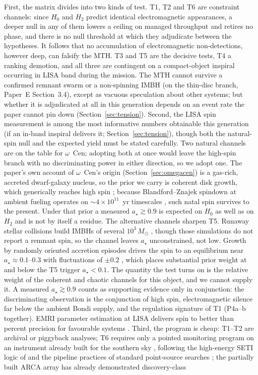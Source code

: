 \documentclass[11pt]{article}
\newcommand{\msun}{\ensuremath{M_\odot}}
\newcommand{\astar}{\ensuremath{a_\star}}
\begin{document}
First, the matrix divides into two kinds of test. T1, T2 and T6 are constraint channels: since $H_0$ and $H_2$ predict identical electromagnetic appearances, a deeper null in any of them lowers a ceiling on managed throughput and retires no phase, and there is no null threshold at which they adjudicate between the hypotheses. It follows that no accumulation of electromagnetic non-detections, however deep, can falsify the MTH. T3 and T5 are the decisive tests, T4 a ranking demotion, and all three are contingent on a compact-object inspiral occurring in LISA band during the mission. The MTH cannot survive a confirmed remnant swarm or a non-spinning IMBH (on the thin-disc branch, Paper~E Section~3.4), except as vacuous speculation about other systems; but whether it is adjudicated at all in this generation depends on an event rate the paper cannot pin down (Section~\ref{sec:tension}). Second, the LISA spin measurement is among the most informative numbers obtainable this generation (if an in-band inspiral delivers it; Section~\ref{sec:tension}), though both the natural-spin null and the expected yield must be stated carefully. Two natural channels are on the table for $\omega$~Cen; adopting both at once would leave the high-spin branch with no discriminating power in either direction, so we adopt one. The paper's own account of $\omega$~Cen's origin (Section~\ref{sec:omegacen}) is a gas-rich, accreted dwarf-galaxy nucleus, so the prior we carry is coherent disk growth, which generically reaches high spin \citep{BertiVolonteri2008,Reynolds2021}; because Blandford--Znajek spindown at ambient fueling operates on $\sim$$4\times10^{11}$~yr timescales \citep{Swanson2026Engineered}, such natal spin survives to the present. Under that prior a measured $\astar \gtrsim 0.9$ is expected on $H_0$ as well as on $H_2$ and is not by itself a residue. The alternative channels sharpen T5. Runaway stellar collisions build IMBHs of several $10^{3}\,\msun$ \citep{Fujii2024}, though those simulations do not report a remnant spin, so the channel leaves $\astar$ unconstrained, not low. Growth by randomly oriented accretion episodes drives the spin to an equilibrium near $\astar \approx 0.1$--$0.3$ with fluctuations of $\pm 0.2$ \citep{KingPringleHofmann2008,BertiVolonteri2008}, which places substantial prior weight at and below the T5 trigger $\astar < 0.1$. The quantity the test turns on is the relative weight of the coherent and chaotic channels for this object, and we cannot supply it. A measured $\astar \gtrsim 0.9$ counts as supporting evidence only in conjunction: the discriminating observation is the conjunction of high spin, electromagnetic silence far below the ambient Bondi supply, and the regulation signature of T1 (P4a--b together). EMRI parameter estimation at LISA delivers spin to better than percent precision for favourable systems \citep{Babak2017,AmaroSeoane2018}. Third, the program is cheap: T1--T2 are archival or piggyback analyses; T6 requires only a pointed monitoring program on an instrument already built for the southern sky \citep{AdrianMartinez2016,KM3NeT2025}, following the high-energy SETI logic of \citet{Lacki2025} and the pipeline practices of standard point-source searches \citep{IceCubePS2020}; the partially built ARCA array has already demonstrated discovery-class 
\end{document}
